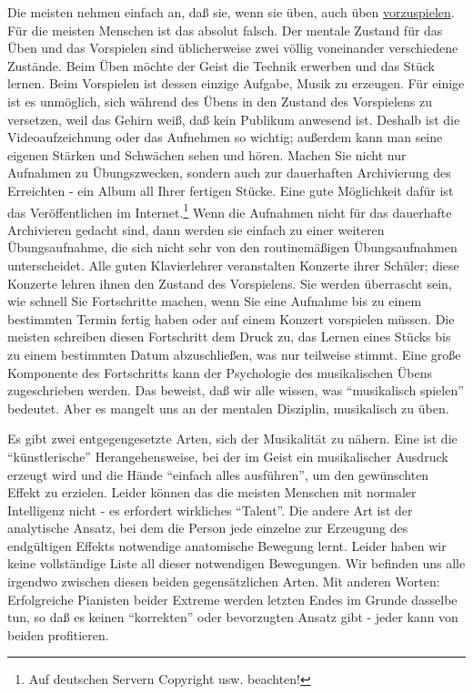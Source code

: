 Die meisten nehmen einfach an, daß sie, wenn sie üben, auch üben \hyperref[c1iii14]{vorzuspielen}.
Für die meisten Menschen ist das absolut falsch.
Der mentale Zustand für das Üben und das Vorspielen sind üblicherweise zwei völlig voneinander verschiedene Zustände.
Beim Üben möchte der Geist die Technik erwerben und das Stück lernen.
Beim Vorspielen ist dessen einzige Aufgabe, Musik zu erzeugen.
Für einige ist es unmöglich, sich während des Übens in den Zustand des Vorspielens zu versetzen, weil das Gehirn weiß, daß kein Publikum anwesend ist.
Deshalb ist die Videoaufzeichnung oder das Aufnehmen so wichtig; außerdem kann man seine eigenen Stärken und Schwächen sehen und hören.
Machen Sie nicht nur Aufnahmen zu Übungszwecken, sondern auch zur dauerhaften Archivierung des Erreichten - ein Album all Ihrer fertigen Stücke.
Eine gute Möglichkeit dafür ist das Veröffentlichen im Internet.\footnote{Auf deutschen Servern Copyright usw. beachten!} 
Wenn die Aufnahmen nicht für das dauerhafte Archivieren gedacht sind, dann werden sie einfach zu einer weiteren Übungsaufnahme, die sich nicht sehr von den routinemäßigen Übungsaufnahmen unterscheidet.
Alle guten Klavierlehrer veranstalten Konzerte ihrer Schüler; diese Konzerte lehren ihnen den Zustand des Vorspielens.
Sie werden überrascht sein, wie schnell Sie Fortschritte machen, wenn Sie eine Aufnahme bis zu einem bestimmten Termin fertig haben oder auf einem Konzert vorspielen müssen.
Die meisten schreiben diesen Fortschritt dem Druck zu, das Lernen eines Stücks bis zu einem bestimmten Datum abzuschließen, was nur teilweise stimmt.
Eine große Komponente des Fortschritts kann der Psychologie des musikalischen Übens zugeschrieben werden.
Das beweist, daß wir alle wissen, was \enquote{musikalisch spielen} bedeutet.
Aber es mangelt uns an der mentalen Disziplin, musikalisch zu üben.

Es gibt zwei entgegengesetzte Arten, sich der Musikalität zu nähern.
Eine ist die \enquote{künstlerische} Herangehensweise, bei der im Geist ein musikalischer Ausdruck erzeugt wird und die Hände \enquote{einfach alles ausführen}, um den gewünschten Effekt zu erzielen.
Leider können das die meisten Menschen mit normaler Intelligenz nicht - es erfordert wirkliches \enquote{Talent}.
Die andere Art ist der analytische Ansatz, bei dem die Person jede einzelne zur Erzeugung des endgültigen Effekts notwendige anatomische Bewegung lernt.
Leider haben wir keine vollständige Liste all dieser notwendigen Bewegungen.
Wir befinden uns alle irgendwo zwischen diesen beiden gegensätzlichen Arten.
Mit anderen Worten: Erfolgreiche Pianisten beider Extreme werden letzten Endes im Grunde dasselbe tun, so daß es keinen \enquote{korrekten} oder bevorzugten Ansatz gibt - jeder kann von beiden profitieren.

